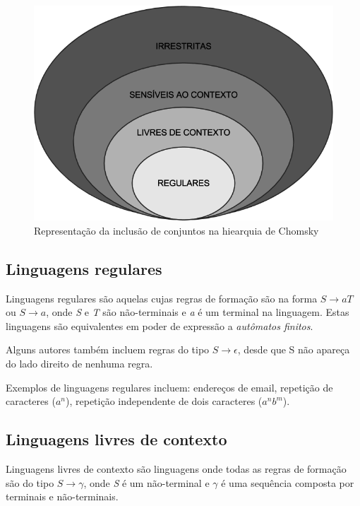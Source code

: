 \documentclass[a4paper,12pt,oneside,onecolumn]{uerj}
\begin{document}
\begin{figure}[ht]
  \centering
  \includegraphics[scale=0.5]{figures/chomsky.png}
  \caption{Representação da inclusão de conjuntos na hiearquia de Chomsky}
  \label{fig:chomsky}
\end{figure}

\subsection{Linguagens regulares}

Linguagens regulares são aquelas cujas regras de formação são na forma $S \rightarrow aT$ ou $S \rightarrow a$, onde \emph{S} e \emph{T} são não-terminais e \emph{a} é um terminal na linguagem. Estas linguagens são equivalentes em poder de expressão a \emph{autômatos finitos}. 

Alguns autores também incluem regras do tipo $S \rightarrow \epsilon$, desde que S não apareça do lado direito de nenhuma regra.

Exemplos de linguagens regulares incluem: endereços de email, repetição de caracteres ($a^n$), repetição independente de dois caracteres ($a^nb^m$).

\subsection{Linguagens livres de contexto}

Linguagens livres de contexto são linguagens onde todas as regras de formação são do tipo $S \rightarrow \gamma$, onde \emph{S} é um não-terminal e $\gamma$ é uma sequência composta por terminais e não-terminais. 
\end{document}
